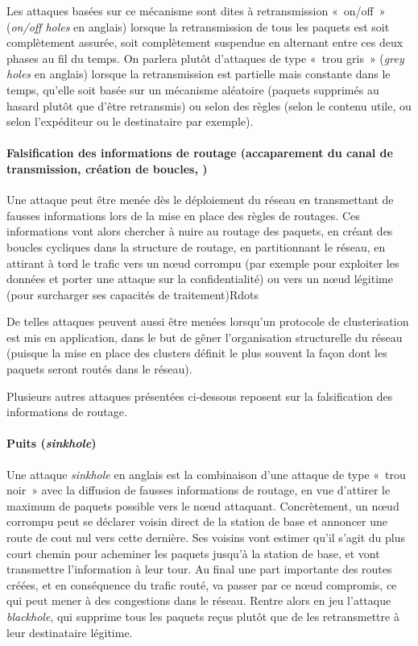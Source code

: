 Les attaques basées sur ce mécanisme sont dites à retransmission « on/off » (\textit{on/off holes} en anglais) lorsque la retransmission de tous les paquets est soit complètement assurée, soit complètement suspendue en alternant entre ces deux phases au fil du temps.
On parlera plutôt d'attaques de type « trou gris » (\textit{grey holes} en anglais) lorsque la retransmission est partielle mais constante dans le temps, qu'elle soit basée sur un mécanisme aléatoire (paquets supprimés au hasard plutôt que d'être retransmis) ou selon des règles (selon le contenu utile, ou selon l'expéditeur ou le destinataire par exemple).

        \paragraph{Falsification des informations de routage (accaparement du canal de transmission, création de boucles, \etc)}
Une attaque peut être menée dès le déploiement du réseau en transmettant de fausses informations lors de la mise en place des règles de routages.
Ces informations vont alors chercher à nuire au routage des paquets, en créant des boucles cycliques dans la structure de routage, en partitionnant le réseau, en attirant à tord le trafic vers un nœud corrompu (par exemple pour exploiter les données et porter une attaque sur la confidentialité) ou vers un nœud légitime (pour surcharger ses capacités de traitement)Rdots

De telles attaques peuvent aussi être menées lorsqu'un protocole de clusterisation est mis en application, dans le but de gêner l'organisation structurelle du réseau (puisque la mise en place des clusters définit le plus souvent la façon dont les paquets seront routés dans le réseau).

Plusieurs autres attaques présentées ci-dessous reposent sur la falsification des informations de routage.

        \paragraph{Puits (\textit{sinkhole})}
Une attaque \textit{sinkhole} en anglais est la combinaison d'une attaque de type « trou noir » avec la diffusion de fausses informations de routage, en vue d'attirer le maximum de paquets possible vers le nœud attaquant.
Concrètement, un nœud corrompu peut se déclarer voisin direct de la station de base et annoncer une route de cout nul vers cette dernière.
Ses voisins vont estimer qu'il s'agit du plus court chemin pour acheminer les paquets jusqu'à la station de base, et vont transmettre l'information à leur tour.
Au final une part importante des routes créées, et en conséquence du trafic routé, va passer par ce nœud compromis, ce qui peut mener à des congestions dans le réseau.
Rentre alors en jeu l'attaque \textit{blackhole}, qui supprime tous les paquets reçus plutôt que de les retransmettre à leur destinataire légitime.

